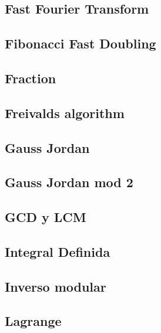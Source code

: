 \subsection{Fast Fourier Transform}
\raggedbottom
\hrulefill
\subsection{Fibonacci Fast Doubling}
\raggedbottom
\hrulefill
\subsection{Fraction}
\raggedbottom
\hrulefill
\subsection{Freivalds algorithm}
\raggedbottom
\hrulefill
\subsection{Gauss Jordan}
\raggedbottom
\hrulefill
\subsection{Gauss Jordan mod 2}
\raggedbottom
\hrulefill
\subsection{GCD y LCM}
\raggedbottom
\hrulefill
\subsection{Integral Definida}
\raggedbottom
\hrulefill
\subsection{Inverso modular}
\raggedbottom
\hrulefill
\subsection{Lagrange}
\raggedbottom
\hrulefill
